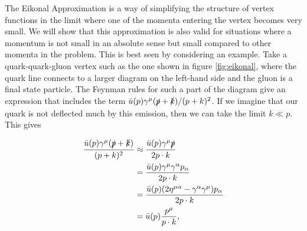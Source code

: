 The Eikonal Approximation is a way of simplifying the structure of vertex functions in the limit where one of the momenta entering the vertex becomes very small. We will show that this approximation is also valid for situations where a momentum is not small in an absolute sense but small compared to other momenta in the problem. This is best seen by considering an example. Take a quark-quark-gluon vertex such as the one shown in figure \ref{fig:eikonal}, where the quark line connects to a larger diagram on the left-hand side and the gluon is a final state particle. The Feynman rules for such a part of the diagram give an expression that includes the term $\bar{u}(p) \gamma^\mu (\slashed{p} + \slashed{k})/(p+k)^2$. If we imagine that our quark is not deflected much by this emission, then we can take the limit $k \ll p$. This gives

\begin{equation}
\begin{split}
\frac{\bar{u}(p) \gamma^\mu (\slashed{p}+\slashed{k})}{(p+k)^2} &\approx \frac{\bar{u}(p)\gamma^\mu \slashed{p}}{2 p \cdot k} \\
&= \frac{\bar{u}(p)\gamma^\mu \gamma^\alpha p_\alpha}{2 p \cdot k} \\
&=  \frac{\bar{u}(p)(2 \eta^{\mu \alpha} - \gamma^\alpha \gamma^\mu) p_\alpha}{2 p \cdot k} \\
&= \bar{u}(p) \frac{p^\mu}{p \cdot k},
\end{split}
\end{equation}


